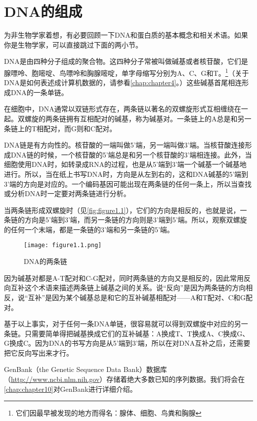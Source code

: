 \section{DNA的组成}
为非生物学家着想，有必要回顾一下DNA和蛋白质的基本概念和相关术语。如果你是生物学家，可以直接跳过下面的两小节。

DNA是由四种分子组成的聚合物。这四种分子常被叫做碱基或者核苷酸，它们是腺嘌呤、胞嘧啶、鸟嘌呤和胸腺嘧啶，单字母缩写分别为A、C、G和T。\footnote{它们因最早被发现的地方而得名：腺体、细胞、鸟粪和胸腺}（关于DNA是如何表述成计算机数据的，请参看\autoref{chap:chapter4}。）这些碱基首尾相连形成DNA的一条单链。

在细胞中，DNA通常以双链形式存在，两条链以著名的双螺旋形式互相缠绕在一起。双螺旋的两条链拥有互相配对的碱基，称为碱基对。一条链上的A总是和另一条链上的T相配对，而G则和C配对。

DNA链是有方向性的。核苷酸的一端叫做5'端，另一端叫做3'端。当核苷酸连接形成DNA链的时候，一个核苷酸的5'端总是和另一个核苷酸的3'端相连接。此外，当细胞使用DNA时，如转录成RNA的过程，也是从5'端到3'端一个碱基一个碱基地进行。所以，当在纸上书写DNA时，方向是从左到右的，这和DNA碱基的5'端到3'端的方向是对应的。一个编码基因可能出现在两条链的任何一条上，所以当查找或分析DNA时一定要对两条链进行分析。

当两条链形成双螺旋时（见\autoref{fig:figure1.1}），它们的方向是相反的，也就是说，一条链的方向是5'端到3'端，而另一条链的方向则是3'端到5'端。所以，观察双螺旋的任何一个末端，都是一条链的3'端和另一条链的5'端。

\begin{figure}
  \centering
  \texttt{[image: figure1.1.png]}
  \caption{DNA的两条链}
  \label{fig:figure1.1}
\end{figure}

因为碱基对都是A-T配对和C-G配对，同时两条链的方向又是相反的，因此常用反向互补这个术语来描述两条链上碱基之间的关系。说“反向”是因为两条链的方向相反，说“互补”是因为某个碱基总是和它的互补碱基相配对——A和T配对、C和G配对。

基于以上事实，对于任何一条DNA单链，很容易就可以得到双螺旋中对应的另一条链。只需要简单得把碱基换成它们的互补碱基：A换成T、T换成A、C换成G、G换成C。因为DNA的书写方向是从5'端到3'端，所以在对DNA互补之后，还需要把它反向写出来才行。

GenBank（the Genetic Sequence Data Bank）数据库（\href{http://www.ncbi.nlm.nih.gov}{http://www.ncbi.nlm.nih.gov}）存储着绝大多数已知的序列数据。我们将会在\autoref{chap:chapter10}对GenBank进行详细介绍。

